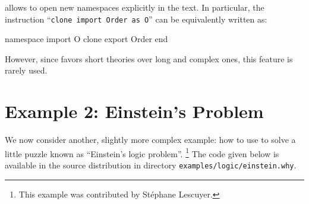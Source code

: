\why allows to open new namespaces explicitly in the text. In particular,
the instruction ``\texttt{clone import Order as O}'' can be equivalently
written as:
\begin{whycode}
namespace import O
  clone export Order
end
\end{whycode}
However, since \why favors short theories over long and complex ones,
this feature is rarely used.

\section{Example 2: Einstein's Problem}

We now consider another, slightly more complex example: how to use \why
to solve a little puzzle known as ``Einstein's logic
problem''.%
\footnote{This \why example was contributed by St\'ephane Lescuyer.}
The code given below is available in the source distribution in
directory \verb|examples/logic/einstein.why|.

